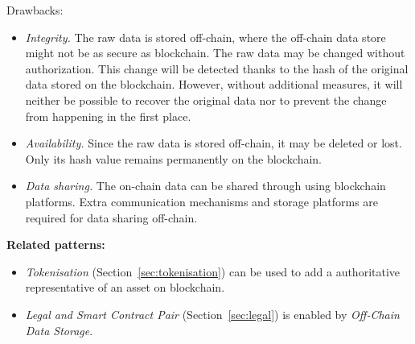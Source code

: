 Drawbacks: 
\begin{itemize}
  \item \textit{Integrity.} The raw data is stored off-chain, where the off-chain data store might not be as secure as blockchain. The raw data may be changed without authorization. This change will be detected thanks to the hash of the original data stored on the blockchain. However, without additional measures, it will neither be possible to recover the original data nor to prevent the change from happening in the first place.
  \item \textit{Availability.} Since the raw data is stored off-chain, it may be deleted or lost. Only its hash value remains permanently on the blockchain.
  \item \textit{Data sharing.} The on-chain data can be shared through using blockchain platforms. Extra communication mechanisms and storage platforms are required for data sharing off-chain.
\end{itemize}


\vspace{0.5em}\noindent \textbf{Related patterns:} 
\begin{itemize}
    \item \textit{Tokenisation} (Section~\ref{sec:tokenisation}) can be used to add a authoritative representative of an asset on blockchain.
    \item \textit{Legal and Smart Contract Pair} (Section~\ref{sec:legal}) is enabled by \textit{Off-Chain Data Storage}.
\end{itemize}


